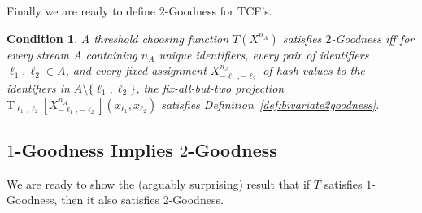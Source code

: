 \documentclass{article}
\newcommand{\txntwo}{\mathrm{T_{\ell_1, \ell_2}}[X^{n_A}_{-\ell_1, -\ell_2}](x_{\ell_1}, x_{\ell_2})}
\newtheorem{condition}[theorem]{Condition}
\begin{document}
Finally we are ready to define $2$-Goodness for TCF's.

\begin{condition}\label{key-condition2}
A threshold choosing function $T(X^{n_A})$ satisfies $2$-Goodness iff for every stream $A$
containing $n_A$ unique identifiers, every pair of identifiers $\ell_1, \ell_2 \in A$, and every fixed 
assignment $X^{n_A}_{-\ell_1, -\ell_2}$ of hash values to the identifiers in $A \!\setminus\! \{\ell_1, \ell_2\}$,
the fix-all-but-two projection $\txntwo$ satisfies Definition~\ref{def:bivariate2goodness}.
\end{condition}


\subsection{$1$-Goodness Implies $2$-Goodness}
\label{1implies2}
We are ready to show the (arguably surprising) result that if $T$ satisfies $1$-Goodness, then it also satisfies $2$-Goodness. 
\end{document}

